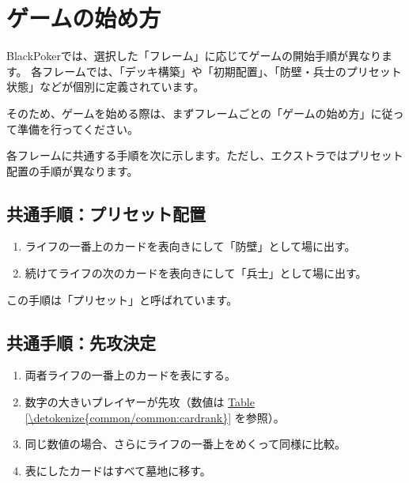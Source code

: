 \documentclass[letterpaper,10pt,dvipdfmx]{sphinxmanual}
\begin{document}
\section{ゲームの始め方}
\label{\detokenize{common/common:common-gamestart}}\label{\detokenize{common/common:id11}}
\sphinxAtStartPar
BlackPokerでは、選択した「フレーム」に応じてゲームの開始手順が異なります。
各フレームでは、「デッキ構築」や「初期配置」、「防壁・兵士のプリセット状態」などが個別に定義されています。

\sphinxAtStartPar
そのため、ゲームを始める際は、まずフレームごとの「ゲームの始め方」に従って準備を行ってください。

\sphinxAtStartPar
各フレームに共通する手順を次に示します。ただし、エクストラではプリセット配置の手順が異なります。


\subsection{共通手順：プリセット配置}
\label{\detokenize{common/common:common-gamestart-preset}}\label{\detokenize{common/common:id12}}\begin{enumerate}
%
\item {} 
\sphinxAtStartPar
ライフの一番上のカードを表向きにして「防壁」として場に出す。

\item {} 
\sphinxAtStartPar
続けてライフの次のカードを表向きにして「兵士」として場に出す。

\end{enumerate}

\sphinxAtStartPar
この手順は「プリセット」と呼ばれています。


\subsection{共通手順：先攻決定}
\label{\detokenize{common/common:common-gamestart-first}}\label{\detokenize{common/common:id13}}\begin{enumerate}
%
\item {} 
\sphinxAtStartPar
両者ライフの一番上のカードを表にする。

\item {} 
\sphinxAtStartPar
数字の大きいプレイヤーが先攻（数値は \hyperref[\detokenize{common/common:cardrank}]{Table \ref{\detokenize{common/common:cardrank}}} を参照）。

\item {} 
\sphinxAtStartPar
同じ数値の場合、さらにライフの一番上をめくって同様に比較。

\item {} 
\sphinxAtStartPar
表にしたカードはすべて墓地に移す。

\end{enumerate}
\end{document}
